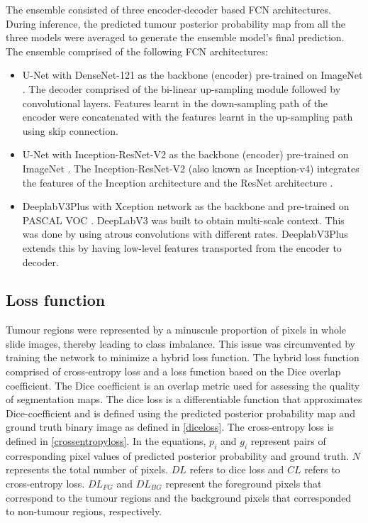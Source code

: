 \documentclass[times,twocolumn,final,authoryear]{tmp}
\begin{document}
The ensemble consisted of three encoder-decoder based FCN architectures. During inference, the predicted tumour posterior probability map from all the three models were averaged to generate the ensemble model's final prediction. The ensemble comprised of the following FCN architectures:
\begin{itemize}
    \item U-Net \citep{ronneberger2015u} with DenseNet-121 \citep{huang2017densely} as the backbone (encoder) pre-trained on ImageNet \citep{deng2009imagenet}. The decoder comprised of the bi-linear up-sampling module followed by convolutional layers. Features learnt in the down-sampling path of the encoder were concatenated with the features learnt in the up-sampling path using skip connection.

    \item U-Net \citep{ronneberger2015u} with Inception-ResNet-V2 \citep{szegedy2017inception} as the backbone (encoder) pre-trained on ImageNet \citep{deng2009imagenet}. The Inception-ResNet-V2 \citep{szegedy2017inception} (also known as Inception-v4) integrates the features of the Inception architecture \citep{szegedy2015going} and the ResNet architecture \citep{he2016deep}.

    \item DeeplabV3Plus \citep{chen2018encoder} with Xception \citep{chollet2017xception} network as the backbone and pre-trained on PASCAL VOC \citep{everingham2010pascal}. DeepLabV3 \citep{chen2017rethinking} was built to obtain multi-scale context. This was done by using atrous convolutions with different rates. DeeplabV3Plus extends this by having low-level features transported from the encoder to decoder.
\end{itemize}


\subsection{Loss function}
Tumour regions were represented by a minuscule proportion of pixels in whole slide images, thereby leading to class imbalance. This issue was circumvented by training the network to minimize a hybrid loss function. The hybrid loss function comprised of cross-entropy loss and a loss function based on the Dice overlap coefficient. The Dice coefficient is an overlap metric used for assessing the quality of segmentation maps. 
The dice loss is a differentiable function that approximates Dice-coefficient and is defined using the predicted posterior probability map and ground truth binary image as defined in \ref{diceloss}. The cross-entropy loss is defined in \ref{crossentropyloss}. In the equations, $p_i$ and  $g_i$  represent pairs of corresponding pixel values of predicted posterior probability and ground truth. $N$ represents the total number of pixels. $DL$ refers to dice loss and $CL$ refers to cross-entropy loss. $DL_{FG}$ and $DL_{BG}$ represent the foreground pixels that correspond to the tumour regions and the background pixels that corresponded to non-tumour regions, respectively.
\end{document}
